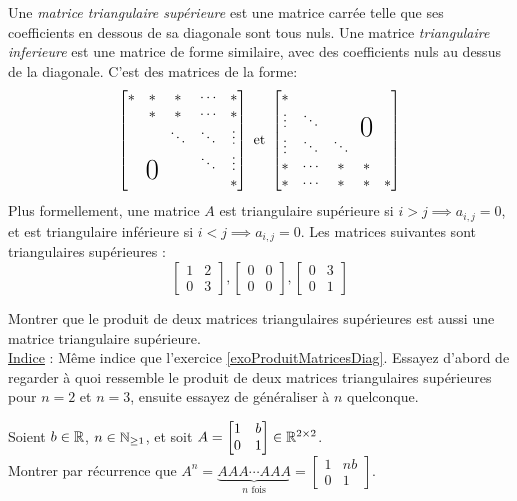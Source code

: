 \begin{exercice}
\label{exoProduitTriangSup}
\noindent Une \textit{matrice triangulaire supérieure} est une matrice carrée telle que ses coefficients en dessous de sa diagonale sont tous nuls. Une matrice \textit{triangulaire inferieure} est une matrice de forme similaire, avec des coefficients nuls au dessus de la diagonale. C'est des matrices de la forme:
$$\begin{bmatrix}
* & * & * & \cdots & * \\
  & * & * & \cdots & * \\
  &   & \ddots & \ddots & \vdots \\
  & \bigzero  &  & \ddots & \vdots \\
  &   &   &  & *
\end{bmatrix} \text{ et }
\begin{bmatrix}
* &  &  &  &  \\
\vdots  & \ddots &  & \bigzero &  \\
\vdots & \ddots & \ddots &  &  \\
* & \cdots & * & * &  \\
*  & \cdots & * & * & *
\end{bmatrix}$$
Plus formellement, une matrice $A$ est triangulaire supérieure si $i > j \implies a_{i,j} = 0$, et est triangulaire inférieure si $i < j \implies a_{i,j} = 0$. Les matrices suivantes sont triangulaires supérieures :
$$
\begin{bmatrix}
1 & 2\\
0 & 3
\end{bmatrix}, \begin{bmatrix}
0 & 0\\
0 & 0
\end{bmatrix},
\begin{bmatrix}
0 & 3\\
0 & 1
\end{bmatrix}
$$

\noindent Montrer que le produit de deux matrices triangulaires supérieures est aussi une matrice triangulaire supérieure. \\

\noindent \underline{Indice} : Même indice que l'exercice \ref{exoProduitMatricesDiag}. Essayez d'abord de regarder à quoi ressemble le produit de deux matrices triangulaires supérieures pour $n=2$ et $n=3$, ensuite essayez de généraliser à $n$ quelconque. \\
\end{exercice}

\begin{exercice}
\noindent Soient $b \in \mathbb{R}$, $n \in \mathbb{N}_{\geq 1}$, et soit $A = \begin{bmatrix} 1 & b \\ 0 & 1 \end{bmatrix} \in \mathbb{R}^{2 \times 2}$. \\
Montrer par récurrence que $A^n = \underbrace{AAA\cdots AAA}_{n \text{ fois}} = \begin{bmatrix}
1 & nb \\ 0 & 1 \end{bmatrix}$. \\
\end{exercice}

